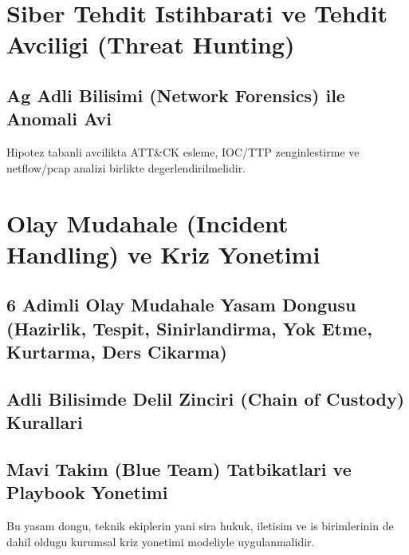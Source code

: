 \section{Siber Tehdit Istihbarati ve Tehdit Avciligi (Threat Hunting)}
\subsection{Ag Adli Bilisimi (Network Forensics) ile Anomali Avi}
Hipotez tabanli avcilikta ATT\&CK esleme, IOC/TTP zenginlestirme ve netflow/pcap analizi birlikte degerlendirilmelidir.

\section{Olay Mudahale (Incident Handling) ve Kriz Yonetimi}
\subsection{6 Adimli Olay Mudahale Yasam Dongusu (Hazirlik, Tespit, Sinirlandirma, Yok Etme, Kurtarma, Ders Cikarma)}
\subsection{Adli Bilisimde Delil Zinciri (Chain of Custody) Kurallari}
\subsection{Mavi Takim (Blue Team) Tatbikatlari ve Playbook Yonetimi}
Bu yasam dongu, teknik ekiplerin yani sira hukuk, iletisim ve is birimlerinin de dahil oldugu kurumsal kriz yonetimi modeliyle uygulanmalidir.
